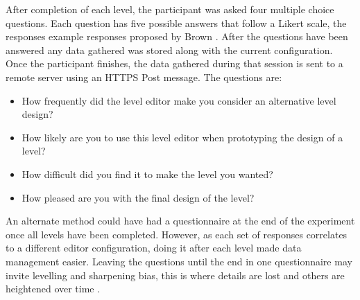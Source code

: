 \documentclass[journal]{IEEEtran}
\begin{document}
 After completion of each level, the participant was asked four multiple choice questions. Each question has five possible answers that follow a Likert scale, the responses example responses proposed by Brown \cite{brown2010likert}. After the questions have been answered any data gathered was stored along with the current configuration. Once the participant finishes, the data gathered during that session is sent to a remote server using an HTTPS Post message.
 The questions are:
\begin{itemize}
    \item How frequently did the level editor make you consider an alternative level design?
    
    \item How likely are you to use this level editor when prototyping the design of a level?

   \item How difficult did you find it to make the level you wanted?

    \item How pleased are you with the final design of the level?
\end{itemize}
An alternate method could have had a questionnaire at the end of the experiment once all levels have been completed. However, as each set of responses correlates to a different editor configuration, doing it after each level made data management easier. Leaving the questions until the end in one questionnaire may invite levelling and sharpening bias, this is where details are lost and others are heightened over time \cite{koriat2000toward}.  

\begin{table}[h]
	\centering
	\caption{Editor Settings}
	\label{settings}
	\def\arraystretch{2}
\end{table}
\end{document}
